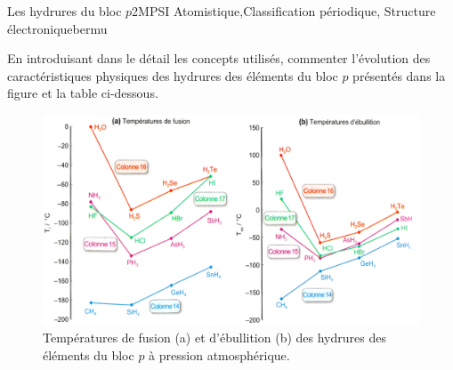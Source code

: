 
\begin{exercise}{Les hydrures du bloc $p$}{2}{MPSI}
{Atomistique,Classification périodique, Structure électronique}{bermu}

\begin{questions}
    
    \questioncours En introduisant dans le détail les concepts utilisés, commenter l'évolution des caractéristiques physiques des hydrures des éléments du bloc $p$ présentés dans la figure et la table ci-dessous.
\end{questions}

    \begin{figure}[H]
        \centering
        \includegraphics[width=.9\linewidth]{chimie/solvants/hydrures.png}
        \caption{Températures de fusion (a) et d'ébullition (b) des hydrures des éléments du bloc $p$ à pression atmosphérique.}
        \label{fig:hydrures}
    \end{figure}

\end{exercise}

